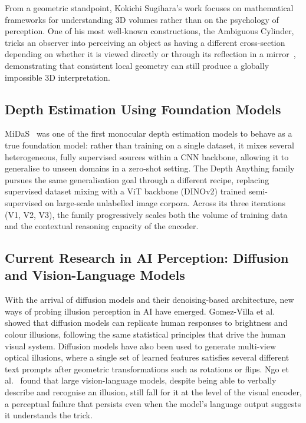 \documentclass[10pt,twocolumn]{article}
\begin{document}
From a geometric standpoint, Kokichi Sugihara's work focuses on mathematical
frameworks for understanding 3D volumes rather than on the psychology of perception.
One of his most well-known constructions, the Ambiguous Cylinder, tricks an observer
into perceiving an object as having a different cross-section depending on whether it is
viewed directly or through its reflection in a mirror~\cite{sugihara2015}, demonstrating
that consistent local geometry can still produce a globally impossible 3D interpretation.

\subsection{Depth Estimation Using Foundation Models}

MiDaS~\cite{ranftl2020} was one of the first monocular depth estimation models to
behave as a true foundation model: rather than training on a single dataset, it
mixes several heterogeneous, fully supervised sources within a CNN backbone,
allowing it to generalise to unseen domains in a zero-shot setting. The Depth
Anything family~\cite{depthanythingv1,depthanythingv2,depthanythingv3} pursues the
same generalisation goal through a different recipe, replacing supervised dataset
mixing with a ViT backbone (DINOv2) trained semi-supervised on large-scale
unlabelled image corpora. Across its three iterations (V1, V2, V3), the family
progressively scales both the volume of training data and the contextual
reasoning capacity of the encoder.

\subsection{Current Research in AI Perception: Diffusion and Vision-Language Models}

With the arrival of diffusion models and their denoising-based architecture, new ways of
probing illusion perception in AI have emerged. Gomez-Villa et al.~\cite{gomezVilla2025}
showed that diffusion models can replicate human responses to brightness and colour
illusions, following the same statistical principles that drive the human visual system.
Diffusion models have also been used to generate multi-view optical illusions, where a
single set of learned features satisfies several different text prompts after geometric
transformations such as rotations or flips. Ngo et al.~\cite{ngo2023} found that large
vision-language models, despite being able to verbally describe and recognise an
illusion, still fall for it at the level of the visual encoder, a perceptual failure that
persists even when the model's language output suggests it understands the trick.
\end{document}
